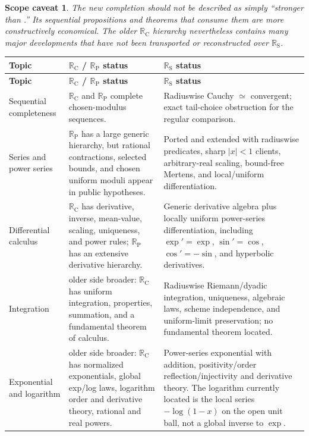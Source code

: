 \documentclass[11pt,a4paper]{article}
\newcommand{\RC}{\mathbb{R}_{\mathrm C}}
\newcommand{\RP}{\mathbb{R}_{\mathrm P}}
\newcommand{\RS}{\mathbb{R}_{\mathrm S}}
\newcommand{\eqv}{\simeq}
\newcommand{\code}[1]{{\ttfamily\seqsplit{#1}}}
\newcommand{\gap}{\textcolor{red!55!black}{\textsf{older side broader}}}
\newtheorem{caveat}{Scope caveat}
\begin{document}
\begin{caveat}
The new completion should not be described as simply ``stronger than
\code{HITs/CauchyReals}.''  Its \emph{sequential propositions and theorems that consume them}
are more constructively economical.  The older $\RC$ hierarchy nevertheless contains many
major developments that have not been transported or reconstructed over $\RS$.
\end{caveat}

\begin{longtable}{>{\raggedright\arraybackslash}p{}
                  >{\raggedright\arraybackslash}p{}
                  >{\raggedright\arraybackslash}p{}}
\toprule
\textbf{Topic} & \textbf{$\RC$ / $\RP$ status} & \textbf{$\RS$ status}\\
\midrule
\endfirsthead
\toprule
\textbf{Topic} & \textbf{$\RC$ / $\RP$ status} & \textbf{$\RS$ status}\\
\midrule
\endhead
\bottomrule
\endfoot

Sequential completeness
& $\RC$ and $\RP$ complete chosen-modulus sequences.
& Radiuswise Cauchy $\eqv$ convergent; exact tail-choice obstruction for the regular comparison.\\

Series and power series
& $\RP$ has a large generic hierarchy, but rational contractions, selected bounds, and
chosen uniform moduli appear in public hypotheses.
& Ported and extended with radiuswise predicates, sharp $|x|<1$ clients, arbitrary-real
scaling, bound-free Mertens, and local/uniform differentiation.\\

Differential calculus
& $\RC$ has derivative, inverse, mean-value, scaling, uniqueness, and power rules;
$\RP$ has an extensive derivative hierarchy.
& Generic derivative algebra plus locally uniform power-series differentiation, including
$\exp' = \exp$, $\sin'=\cos$, $\cos'=-\sin$, and hyperbolic derivatives.\\

Integration
& \gap: $\RC$ has uniform integration, properties, summation, and a fundamental theorem of
calculus.
& Radiuswise Riemann/dyadic integration, uniqueness, algebraic laws, scheme independence,
and uniform-limit preservation; no fundamental theorem located.\\

Exponential and logarithm
& \gap: $\RC$ has normalized exponentials, global exp/log laws, logarithm order and
derivative theory, rational and real powers.
& Power-series exponential with addition, positivity/order reflection/injectivity and
derivative theory.  The logarithm currently located is the local series $-\log(1-x)$ on the
open unit ball, not a global inverse to $\exp$.\\


\end{longtable}
\end{document}
